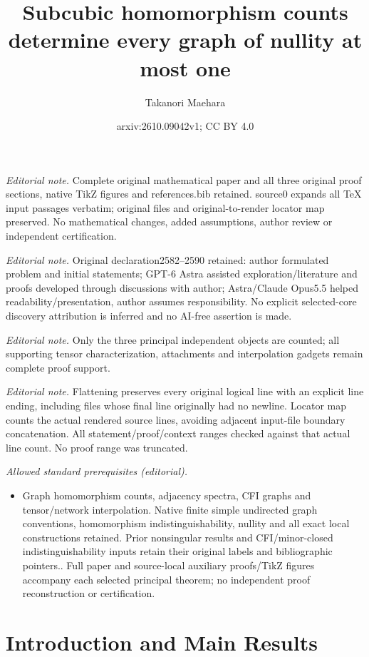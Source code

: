 \documentclass[10pt,a4paper]{article}
\title{Subcubic homomorphism counts determine every graph of nullity at most one}
\author{Takanori Maehara}
\date{arxiv:2610.09042v1; CC BY 4.0}
\theoremstyle{plain}
\theoremstyle{definition}
\begin{document}
\maketitle
\noindent\textit{Editorial note.} Complete original mathematical paper and all three original proof sections, native TikZ figures and references.bib retained. source0 expands all TeX input passages verbatim; original files and original-to-render locator map preserved. No mathematical changes, added assumptions, author review or independent certification.\par\medskip
\noindent\textit{Editorial note.} Original declaration2582--2590 retained: author formulated problem and initial statements; GPT-6 Astra assisted exploration/literature and proofs developed through discussions with author; Astra/Claude Opus5.5 helped readability/presentation, author assumes responsibility. No explicit selected-core discovery attribution is inferred and no AI-free assertion is made.\par\medskip
\noindent\textit{Editorial note.} Only the three principal independent objects are counted; all supporting tensor characterization, attachments and interpolation gadgets remain complete proof support.\par\medskip
\noindent\textit{Editorial note.} Flattening preserves every original logical line with an explicit line ending, including files whose final line originally had no newline. Locator map counts the actual rendered source lines, avoiding adjacent input-file boundary concatenation. All statement/proof/context ranges checked against that actual line count. No proof range was truncated.\par\medskip
\noindent\textit{Allowed standard prerequisites (editorial).}\begin{itemize}
\item Graph homomorphism counts, adjacency spectra, CFI graphs and tensor/network interpolation. Native finite simple undirected graph conventions, homomorphism indistinguishability, nullity and all exact local constructions retained. Prior nonsingular results and CFI/minor-closed indistinguishability inputs retain their original labels and bibliographic pointers.. Full paper and source-local auxiliary proofs/TikZ figures accompany each selected principal theorem; no independent proof reconstruction or certification.
\end{itemize}\medskip
\section{Introduction and Main Results}
\label{sec:intro}
\end{document}
